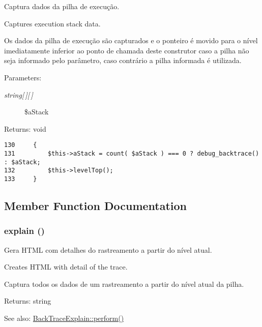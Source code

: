 Captura dados da pilha de execução.

Captures execution stack data.

Os dados da pilha de execução são capturados e o ponteiro é movido para o nível imediatamente inferior ao ponto de chamada deste construtor caso a pilha não seja informado pelo parâmetro, caso contrário a pilha informada é utilizada.

\begin{Desc}
\item[Parameters:]
\begin{description}
\item[{\em string\mbox{[}$\,$\mbox{]}\mbox{[}$\,$\mbox{]}}]\$aStack \end{description}
\end{Desc}
\begin{Desc}
\item[Returns:]void \end{Desc}


\begin{Code}\begin{verbatim}130     {
131         $this->aStack = count( $aStack ) === 0 ? debug_backtrace() : $aStack;
132         $this->levelTop();
133     }
\end{verbatim}
\end{Code}




\subsection{Member Function Documentation}
\hypertarget{class_back_trace_d5d0eb4a7673238105f5ed4734523428}{
\subsubsection[{explain}]{\setlength{\rightskip}{0pt plus 5cm}explain ()}}
\label{class_back_trace_d5d0eb4a7673238105f5ed4734523428}


Gera HTML com detalhes do rastreamento a partir do nível atual.

Creates HTML with detail of the trace.

Captura todos os dados de um rastreamento a partir do nível atual da pilha.

\begin{Desc}
\item[Returns:]string \end{Desc}
\begin{Desc}
\item[See also:]\hyperlink{class_back_trace_explain_4e3e5944ef133f107e9ebc98f1abde0a}{BackTraceExplain::perform()} \end{Desc}


